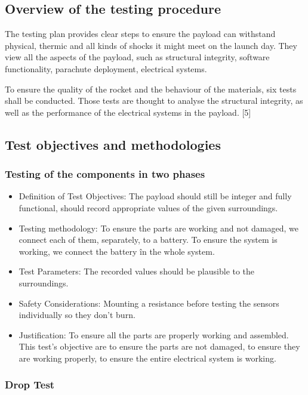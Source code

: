 \subsection{Overview of the testing procedure}

The testing plan provides clear steps to ensure the payload can withstand physical, thermic and all kinds of shocks it might meet on the launch day. They view all the aspects of the payload, such as structural integrity, software functionality, parachute deployment, electrical systems. 

To ensure the quality of the rocket and the behaviour of the materials, six tests shall be conducted. Those tests are thought to analyse the structural integrity, as well as the performance of the electrical systems in the payload. [5]

\subsection{Test objectives and methodologies}

\subsubsection{Testing of the components in two phases}

\begin{itemize}
 \item Definition of Test Objectives: The payload should still be integer and fully functional, should record appropriate values of the given surroundings.
 \item Testing methodology: To ensure the parts are working and not damaged, we connect each of them, separately, to a battery. To ensure the system is working, we connect the battery în the whole system.
 \item Test Parameters: The recorded values should be plausible to the surroundings.
 \item Safety Considerations: Mounting a resistance before testing the sensors individually so they don’t burn.
 \item Justification: To ensure all the parts are properly working and assembled. This test’s objective are to ensure the parts are not damaged, to ensure they are working properly, to ensure the entire electrical system is working.
\end{itemize}

\subsubsection{Drop Test}

